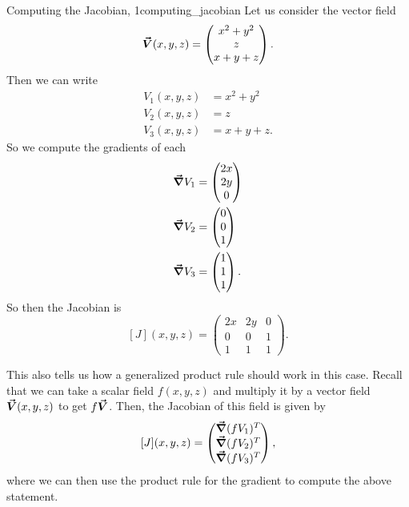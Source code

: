 		        \begin{ex}{Computing the Jacobian, 1}{computing_jacobian}
		        Let us consider the vector field
		        \[
		        \boldsymbol{\vec{V}}(x,y,z) = \begin{pmatrix} x^2+y^2 \\ z \\x+y+z\end{pmatrix}.
		        \]
		        Then we can write
		        \begin{align*}
		            V_1(x,y,z)&= x^2+y^2\\
		            V_2(x,y,z)&= z\\
		            V_3(x,y,z)&= x+y+z.
		        \end{align*}
		        So we compute the gradients of each
		        \begin{align*}
		            \boldsymbol{\vec{\nabla}} V_1 &= \begin{pmatrix} 2x \\ 2y \\ 0 \end{pmatrix}\\
		            \boldsymbol{\vec{\nabla}} V_2 &= \begin{pmatrix} 0 \\ 0 \\ 1 \end{pmatrix}\\
		            \boldsymbol{\vec{\nabla}} V_3 &= \begin{pmatrix} 1 \\ 1 \\ 1 \end{pmatrix}.
		        \end{align*}
		        So then the Jacobian is
		        \[
		        [J](x,y,z) = \begin{pmatrix} 2x & 2y & 0 \\ 0 & 0 & 1\\ 1 & 1 & 1 \end{pmatrix}.
		        \]
		        \end{ex}

		        		       	This also tells us how a generalized product rule should work in this case.  Recall that we can take a scalar field $f(x,y,z)$ and multiply it by a vector field $\boldsymbol{\vec{V}}(x,y,z)$ to get $f\boldsymbol{\vec{V}}$.  Then, the Jacobian of this field is given by
		        		       	\[
		        		       	[J](x,y,z) = \begin{pmatrix} \boldsymbol{\vec{\nabla}} (fV_1)^T \\ \boldsymbol{\vec{\nabla}}(fV_2)^T \\ \boldsymbol{\vec{\nabla}}(fV_3)^T\end{pmatrix},
		        		       	\]
		        		       	where we can then use the product rule for the gradient to compute the above statement.


